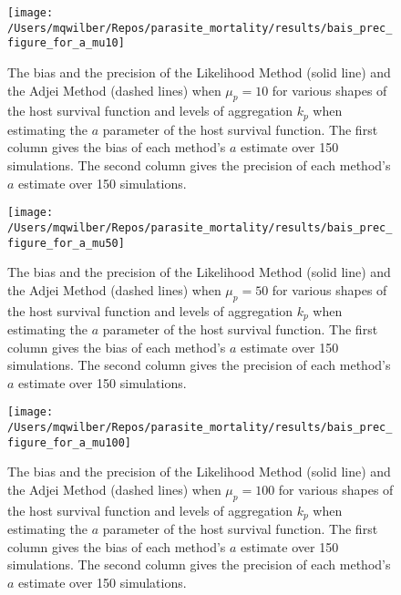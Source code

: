 \documentclass[12pt, a4paper]{article}
\begin{document}
\begin{figure}

    \texttt{[image: /Users/mqwilber/Repos/parasite\_mortality/results/bais\_prec\_figure\_for\_a\_mu10]}

    \caption{The bias and the precision of the Likelihood Method (solid line) and the Adjei Method (dashed lines) when $\mu_p = 10$ for various shapes of the host survival function and levels of aggregation $k_p$ when estimating the $a$ parameter of the host survival function.  The first column gives the bias of each method's $a$ estimate over 150 simulations. The second column gives the precision of each method's $a$ estimate over 150 simulations.}

    \label{fig:biasa_10}

\end{figure}

\begin{figure}

    \texttt{[image: /Users/mqwilber/Repos/parasite\_mortality/results/bais\_prec\_figure\_for\_a\_mu50]}

    \caption{The bias and the precision of the Likelihood Method (solid line) and the Adjei Method (dashed lines) when $\mu_p = 50$ for various shapes of the host survival function and levels of aggregation $k_p$ when estimating the $a$ parameter of the host survival function.  The first column gives the bias of each method's $a$ estimate over 150 simulations. The second column gives the precision of each method's $a$ estimate over 150 simulations.}

    \label{fig:biasa_50}

\end{figure}

\begin{figure}

    \texttt{[image: /Users/mqwilber/Repos/parasite\_mortality/results/bais\_prec\_figure\_for\_a\_mu100]}

    \caption{The bias and the precision of the Likelihood Method (solid line) and the Adjei Method (dashed lines) when $\mu_p = 100$ for various shapes of the host survival function and levels of aggregation $k_p$ when estimating the $a$ parameter of the host survival function.  The first column gives the bias of each method's $a$ estimate over 150 simulations. The second column gives the precision of each method's $a$ estimate over 150 simulations.}

    \label{fig:biasa_100}

\end{figure}
\end{document}
